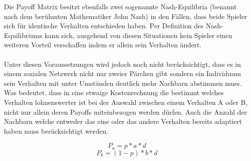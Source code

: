 \documentclass[12pt]{article}
\begin{document}
Die Payoff Matrix besitzt ebenfalls zwei sogenannte Nash-Equilibria (benannt nach dem berühmten Mathematiker John Nash) in den Fällen, dass beide Spieler sich für identische Verhalten entschieden haben. Per Definition des Nash-Equilibriums kann sich, ausgehend von diesen Situationen kein Spieler einen weiteren Vorteil verschaffen indem er allein sein Verhalten ändert.\\\\
Unter diesen Voraussetzungen wird jedoch noch nicht berücksichtigt, dass es in einem sozialen Netzwerk nicht nur zweier Pärchen gibt sondern ein Individuum sein Verhalten mit unter Umständen deutlich mehr Nachbarn abstimmen muss. Was bedeutet, dass in eine etwaige Kostenrechnung die bestimmt welches Verhalten lohnenswerter ist bei der Auswahl zwischen einem Verhalten A oder B, nicht nur allein deren Payoffs miteinbezogen werden dürfen. Auch die Anzahl der Nachbarn welche entweder das eine oder das andere Verhalten bereits adaptiert haben muss berücksichtigt werden.

 \begin{equation}
 \label{formel_payoffA}
 P_a = p*a*d
 \end{equation}
 \begin{equation}
 \label{formel_payoffB}
 P_b = (1-p)*b*d
 \end{equation}
 
\end{document}

